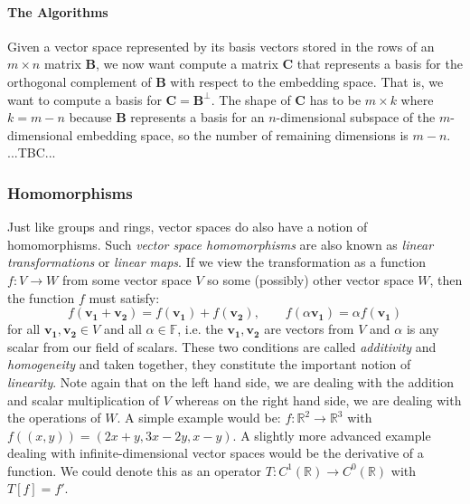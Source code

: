 
\paragraph{The Algorithms}
Given a vector space represented by its basis vectors stored in the rows of an $m \times n$ matrix $\mathbf{B}$, we now want compute a matrix $\mathbf{C}$ that represents a basis for the orthogonal complement of $\mathbf{B}$ with respect to the embedding space. That is, we want to compute a basis for $\mathbf{C} = \mathbf{B}^\perp$. The shape of $\mathbf{C}$ has to be $m \times k$ where $k = m - n$ because $\mathbf{B}$ represents a basis for an $n$-dimensional subspace of the $m$-dimensional embedding space, so the number of remaining dimensions is $m-n$. ...TBC...


\subsubsection{Homomorphisms}
Just like groups and rings, vector spaces do also have a notion of homomorphisms. Such \emph{vector space homomorphisms} are also known as \emph{linear transformations} or \emph{linear maps}. If we view the transformation as a function $f: V \rightarrow W$ from some vector space $V$ so some (possibly) other vector space $W$, then the function $f$ must satisfy:
\begin{equation}
  f(\mathbf{v_1} + \mathbf{v_2}) = f(\mathbf{v_1}) + f(\mathbf{v_2}), \qquad
  f(\alpha \mathbf{v_1}) = \alpha f(\mathbf{v_1})
\end{equation}
for all $\mathbf{v_1, v_2} \in V$ and all $\alpha \in \mathbb{F}$, i.e. the $\mathbf{v_1, v_2}$ are vectors from $V$ and $\alpha$ is any scalar from our field of scalars. These two conditions are called \emph{additivity} and \emph{homogeneity} and taken together, they constitute the important notion of \emph{linearity}. Note again that on the left hand side, we are dealing with the addition and scalar multiplication of $V$ whereas on the right hand side, we are dealing with the operations of $W$. A simple example would be: $f: \mathbb{R}^2 \rightarrow \mathbb{R}^3$ with $f((x,y)) = (2 x + y, 3 x - 2 y, x - y)$. A slightly more advanced example dealing with infinite-dimensional vector spaces would be the derivative of a function. We could denote this as an operator $T: C^1(\mathbb{R}) \rightarrow C^0(\mathbb{R}) $ with $T[f] = f'$.

